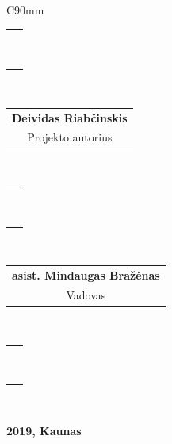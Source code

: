 \begin{titlepage}
\begin{center}
     \singlespacing
     \begin{table}[H]
       \centering
      \begin{tabular}{C{90mm}}
      \hline
      \begin{tabular}{@{}c@{}}~\\~\end{tabular} \\
      \begin{tabular}{@{}c@{}}\textbf{Deividas Riabčinskis}\\Projekto autorius\end{tabular} \\
      \begin{tabular}{@{}c@{}}~\\~\end{tabular} \\
      \begin{tabular}{@{}c@{}}\textbf{asist. Mindaugas Bražėnas}\\Vadovas\end{tabular} \\
      \begin{tabular}{@{}c@{}}~\\~\end{tabular} \\ \hline
      \end{tabular}
    \end{table}

\onehalfspacing

     \vfill

     \textbf{2019, Kaunas}

   \end{center}
\end{titlepage}
